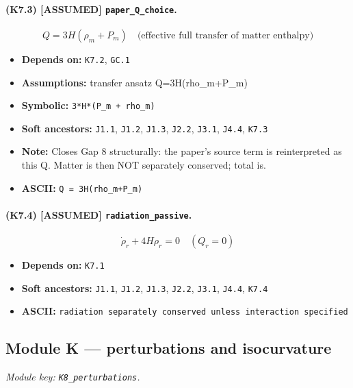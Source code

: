 \documentclass[11pt,a4paper]{article}
\theoremstyle{remark}\newtheorem*{caution}{Caution}
\newcommand{\tagbox}[1]{\textsc{[#1]}}
\begin{document}
\paragraph{(K7.3) \tagbox{ASSUMED} \texttt{paper\_Q\_choice}.}
\begin{equation}
Q=3H(\rho_m+P_m)\quad\text{(effective full transfer of matter enthalpy)}
\tag{K7.3}
\end{equation}
\begin{itemize}\setlength{\itemsep}{0.12em}
\item \textbf{Depends on:} \texttt{K7.2}, \texttt{GC.1}
\item \textbf{Assumptions:} transfer ansatz Q=3H(rho\_m+P\_m)
\item \textbf{Symbolic:} \texttt{3*H*(P\_m + rho\_m)}
\item \textbf{Soft ancestors:} \texttt{J1.1}, \texttt{J1.2}, \texttt{J1.3}, \texttt{J2.2}, \texttt{J3.1}, \texttt{J4.4}, \texttt{K7.3}
\item \textbf{Note:} Closes Gap 8 structurally: the paper's source term is reinterpreted as this Q. Matter is then NOT separately conserved; total is.
\item \textbf{ASCII:} \texttt{Q = 3H(rho\_m+P\_m)}
\end{itemize}
\paragraph{(K7.4) \tagbox{ASSUMED} \texttt{radiation\_passive}.}
\begin{equation}
\dot\rho_r+4H\rho_r=0\quad(Q_r=0)
\tag{K7.4}
\end{equation}
\begin{itemize}\setlength{\itemsep}{0.12em}
\item \textbf{Depends on:} \texttt{K7.1}
\item \textbf{Soft ancestors:} \texttt{J1.1}, \texttt{J1.2}, \texttt{J1.3}, \texttt{J2.2}, \texttt{J3.1}, \texttt{J4.4}, \texttt{K7.4}
\item \textbf{ASCII:} \texttt{radiation separately conserved unless interaction specified}
\end{itemize}
\subsection{Module K --- perturbations and isocurvature}
\textit{Module key: \texttt{K8\_perturbations}.}
\end{document}
